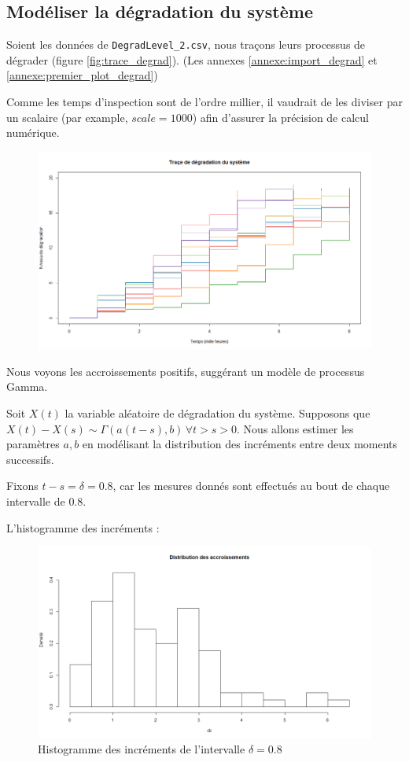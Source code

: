 \documentclass[10pt,a4paper]{article}
\begin{document}
\subsection{Modéliser la dégradation du système}

Soient les données de \texttt{DegradLevel\_2.csv}, nous traçons leurs processus de dégrader (figure \eqref{fig:trace_degrad}). (Les annexes \eqref{annexe:import_degrad} et \eqref{annexe:premier_plot_degrad})

Comme les temps d'inspection sont de l'ordre millier, il vaudrait de les diviser par un scalaire (par example, $scale = 1000$) afin d'assurer la précision de calcul numérique.

\begin{figure}
    \centering
    \includegraphics[width=\textwidth]{img/trace_degrad.png}
    \label{fig:trace_degrad}
\end{figure}

Nous voyons les accroissements positifs, suggérant un modèle de processus Gamma.

Soit $X(t)$ la variable aléatoire de dégradation du système. Supposons que $X(t) - X(s) \sim \Gamma(a(t-s),b)\,\forall t > s > 0$. Nous allons estimer les paramètres $a,b$ en modélisant la distribution des incréments entre deux moments successifs.

Fixons $t-s = \delta = 0.8$, car les mesures donnés sont effectués au bout de chaque intervalle de $0.8$.

L'histogramme des incréments :
\begin{figure}[!h]
    \centering
    \includegraphics[width=\textwidth]{img/histo_degrad.png}
    \caption{Histogramme des incréments de l'intervalle $\delta = 0.8$}
    \label{fig:histo_degrad}
\end{figure}
\end{document}

